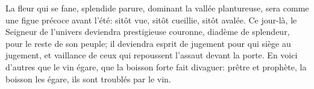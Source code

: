 La fleur qui se fane, splendide parure, dominant la vallée plantureuse,
	sera comme une figue précoce avant l’été:
	sitôt vue, sitôt cueillie, sitôt avalée.
Ce jour-là, le Seigneur de l’univers deviendra prestigieuse couronne,
		diadème de splendeur, pour le reste de son peuple;
	il deviendra esprit de jugement pour qui siège au jugement,
	et vaillance de ceux qui repoussent l’assaut devant la porte.
En voici d’autres que le vin égare, que la boisson forte fait divaguer:
	prêtre et prophète, la boisson les égare, ils sont troublés par le vin.

